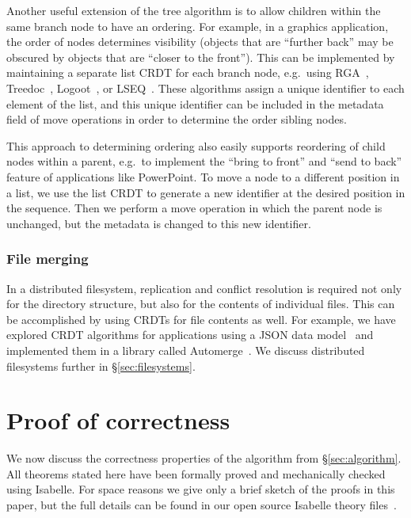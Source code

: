 \documentclass[sigplan,anonymous]{acmart}
\begin{document}
Another useful extension of the tree algorithm is to allow children within the same branch node to have an ordering.
For example, in a graphics application, the order of nodes determines visibility (objects that are ``further back'' may be obscured by objects that are ``closer to the front'').
This can be implemented by maintaining a separate list CRDT for each branch node, e.g.\ using RGA~\cite{Roh:2011dw}, Treedoc~\cite{Preguica:2009fz}, Logoot~\cite{Weiss:2010hx}, or LSEQ~\cite{Nedelec:2013ky}.
These algorithms assign a unique identifier to each element of the list, and this unique identifier can be included in the metadata field of move operations in order to determine the order sibling nodes.

This approach to determining ordering also easily supports reordering of child nodes within a parent, e.g.\ to implement the ``bring to front'' and ``send to back'' feature of applications like PowerPoint.
To move a node to a different position in a list, we use the list CRDT to generate a new identifier at the desired position in the sequence.
Then we perform a move operation in which the parent node is unchanged, but the metadata is changed to this new identifier.

\subsubsection{File merging}\label{sec:files}

In a distributed filesystem, replication and conflict resolution is required not only for the directory structure, but also for the contents of individual files.
This can be accomplished by using CRDTs for file contents as well.
For example, we have explored CRDT algorithms for applications using a JSON data model~\cite{Kleppmann:2016ve,LocalFirst} and implemented them in a library called Automerge~\cite{Automerge}.
We discuss distributed filesystems further in \S\ref{sec:filesystems}.

\section{Proof of correctness}\label{sec:proof}

We now discuss the correctness properties of the algorithm from \S\ref{sec:algorithm}.
All theorems stated here have been formally proved and mechanically checked using Isabelle.
For space reasons we give only a brief sketch of the proofs in this paper, but the full details can be found in our open source Isabelle theory files~\cite{SourceFiles}.
\end{document}
